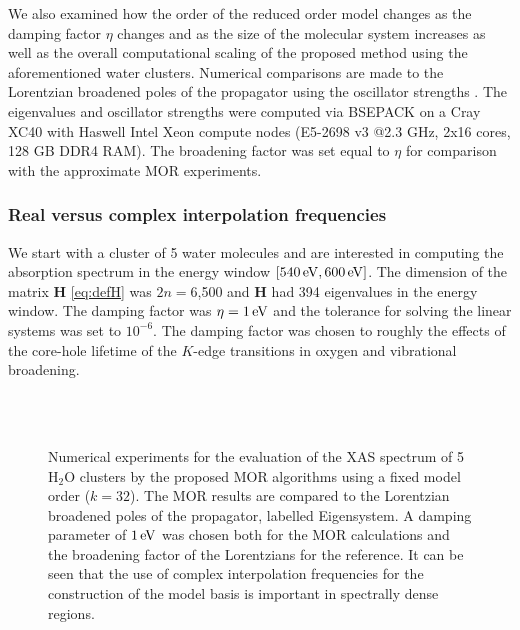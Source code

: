 We also examined how the order of the reduced order model changes as the damping factor $\eta$ changes and as the size of the molecular system increases as well as the overall computational scaling of the proposed method using the aforementioned water clusters. Numerical comparisons are made to the Lorentzian broadened poles of the propagator using the oscillator strengths \cite{Ball64_844,Harris69_3947,McKoy75_1168}. The eigenvalues and oscillator strengths were computed via BSEPACK\cite{bsepack,SJYDL2016} on a Cray XC40 with Haswell Intel Xeon compute nodes (E5-2698 v3 @2.3 GHz, 2x16 cores, 128 GB DDR4 RAM). The broadening factor was set equal to $\eta$ for comparison with the approximate MOR experiments.

\subsubsection{Real versus complex interpolation frequencies}
\label{sec:MORresults-points}

We start with a cluster of 5 water molecules and are interested in computing
the absorption spectrum in the energy window $[540\,\mathrm{eV},600\,\mathrm{eV}]$. The
dimension of the matrix $\mathbf{H}$ \cref{eq:defH} was $2n = 6$,500 and $\mathbf{H}$ had
394 eigenvalues in the energy window. The damping factor was $\eta = 1\,\mathrm{eV}$
and the tolerance for solving the linear systems was set to $10^{-6}$. The
damping factor was chosen to roughly  the effects of the core-hole
lifetime of the $K$-edge transitions in oxygen and vibrational
broadening\cite{Stohr_book}. 

\begin{figure}[hbtp]
%
\\[10pt]
%
\\[10pt]
\caption{Numerical experiments for the evaluation of the XAS spectrum of 5 H$_2$O
clusters by the proposed MOR algorithms using a fixed model order ($k = 32$).
The MOR results are compared to the Lorentzian broadened poles of the
propagator, labelled Eigensystem. A damping parameter of $1\,\mathrm{eV}$ was chosen both
for the MOR calculations and the broadening factor of the Lorentzians for the
reference. It can be seen that the use of complex interpolation frequencies
for the construction of the model basis is important in spectrally dense
regions.}
\label{fig:fixed}
\end{figure}


